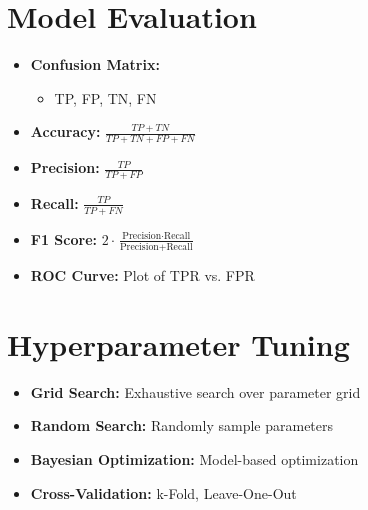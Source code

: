 \documentclass[a4paper,10pt]{article}
\begin{document}
\begin{multicols}{3}
\section*{Model Evaluation}
\begin{itemize}
    \item \textbf{Confusion Matrix:}
    \begin{itemize}
        \item TP, FP, TN, FN
    \end{itemize}
    \item \textbf{Accuracy:} $\frac{TP + TN}{TP + TN + FP + FN}$
    \item \textbf{Precision:} $\frac{TP}{TP + FP}$
    \item \textbf{Recall:} $\frac{TP}{TP + FN}$
    \item \textbf{F1 Score:} $2 \cdot \frac{\text{Precision} \cdot \text{Recall}}{\text{Precision} + \text{Recall}}$
    \item \textbf{ROC Curve:} Plot of TPR vs. FPR
\end{itemize}

\section*{Hyperparameter Tuning}
\begin{itemize}
    \item \textbf{Grid Search:} Exhaustive search over parameter grid
    \item \textbf{Random Search:} Randomly sample parameters
    \item \textbf{Bayesian Optimization:} Model-based optimization
    \item \textbf{Cross-Validation:} k-Fold, Leave-One-Out
\end{itemize}

\end{multicols}
\end{document}

